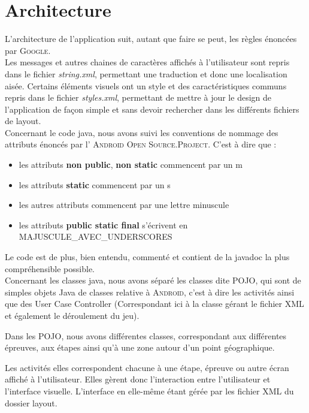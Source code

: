 \documentclass[11pt]{scrreprt}
\begin{document}
    \chapter{Architecture}
    L'architecture de l'application suit, autant que faire se peut, les règles énoncées par \textsc{Google}.\\

    Les messages et autres chaines de caractères affichés à l'utilisateur sont repris dans le fichier \textit{string.xml}, permettant une traduction et donc une localisation aisée. Certains éléments visuels ont un style et des caractéristiques communs repris dans le fichier \textit{styles.xml}, permettant de mettre à jour le design de l'application de façon simple et sans devoir rechercher dans les différents fichiers de layout.\\

    Concernant le code java, nous avons suivi les conventions de nommage des attributs énoncés par l' \textsc{Android Open Source.Project}. C'est à dire que :
    \begin{itemize}
        \item les attributs \textbf{non public}, \textbf{non static} commencent par un m
        \item les attributs \textbf{static} commencent par un s
        \item les autres attributs commencent par une lettre minuscule
        \item les attributs \textbf{public static final} s'écrivent en MAJUSCULE\_AVEC\_UNDERSCORES
    \end{itemize}

    Le code est de plus, bien entendu, commenté et contient de la javadoc la plus compréhensible possible.\\

    Concernant les classes java, nous avons séparé les classes dite \og POJO\fg, qui sont de simples objets Java de classes relative à \textsc{Android}, c'est à dire les activités ainsi que des \og User Case Controller\fg{} (Correspondant ici à la classe gérant le fichier XML et également le déroulement du jeu).

    Dans les POJO, nous avons différentes classes, correspondant aux différentes épreuves, aux étapes ainsi qu'à une zone autour d'un point géographique.

    Les activités elles correspondent chacune à une étape, épreuve ou autre écran affiché à l'utilisateur. Elles gèrent donc l'interaction entre l'utilisateur et l'interface visuelle. L'interface en elle-même étant gérée par les fichier XML du dossier layout.
\end{document}
